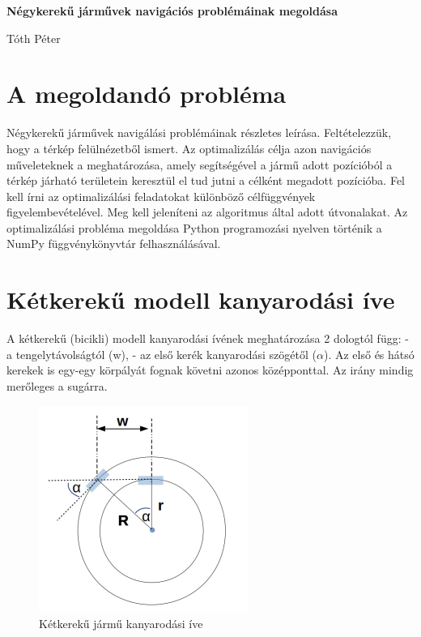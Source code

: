 \documentclass[a4paper]{paper}
\begin{document}
\begin{center}
    \Large
    \textbf{Négykerekű járművek navigációs problémáinak megoldása}

    \medskip   

    \Large
    Tóth Péter
\end{center}

\vskip 1cm

\pagestyle{empty}

\section{A megoldandó probléma}

Négykerekű járművek navigálási problémáinak részletes leírása. Feltételezzük, hogy a térkép felülnézetből ismert. Az optimalizálás célja azon navigációs műveleteknek a meghatározása, amely segítségével a jármű adott pozícióból a térkép járható területein keresztül el tud jutni a célként megadott pozícióba. Fel kell írni az optimalizálási feladatokat különböző célfüggvények figyelembevételével. Meg kell jeleníteni az algoritmus által adott útvonalakat. Az optimalizálási probléma megoldása Python programozási nyelven történik a NumPy függvénykönyvtár felhasználásával.

\section{Kétkerekű modell kanyarodási íve}

A kétkerekű (bicikli) modell kanyarodási ívének meghatározása 2 dologtól függ:\newline
\phantom{asd} - a tengelytávolságtól (w),\newline
\phantom{asd} - az első kerék kanyarodási szögétől ($\alpha$).\newline
Az első és hátsó kerekek is egy-egy körpályát fognak követni azonos középponttal. Az irány mindig merőleges a sugárra.

\begin{figure}[h!]
\centering
\includegraphics[scale=0.5]{images/two_wheels_rad.png}
\caption{Kétkerekű jármű kanyarodási íve}
\label{fig:two_wheels_rad}
\end{figure}
\end{document}
